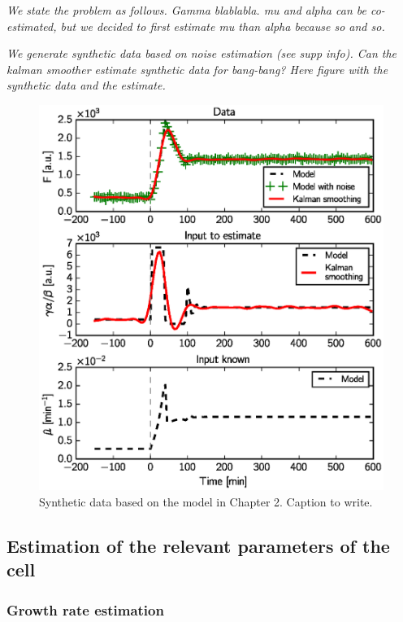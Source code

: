 \textit{
We state the problem as follows.
Gamma blablabla.
mu and alpha can be co-estimated, but we decided to first estimate mu than alpha because so and so.
}

\textit{
We generate synthetic data based on noise estimation (see supp info).
Can the kalman smoother estimate synthetic data for bang-bang?
Here figure with the synthetic data and the estimate.
}

\begin{figure}[h!]
\centering
\includegraphics[scale=1]{./Fig/synthetic_upshift}
\caption{Synthetic data based on the model in Chapter 2. Caption to write.}
\label{fig:synthetic_upshift}
\end{figure}

\subsection{Estimation of the relevant parameters of the cell}

\subsubsection*{Growth rate estimation}

